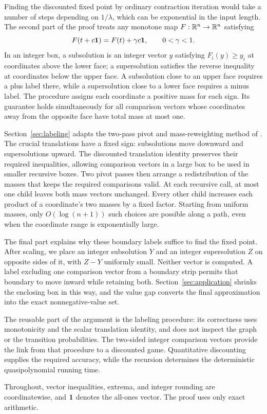 Finding the discounted fixed point by ordinary contraction iteration
would take a number of steps depending on $1/\lambda$, which can be
exponential in the input length. The second part of the proof treats
any monotone map $F:\mathbb R^n\to\mathbb R^n$ satisfying
\[
             F(t+c\mathbf 1)=F(t)+\gamma c\mathbf 1,
             \qquad 0<\gamma<1.
\]
In an integer box, a subsolution is an integer vector $y$ satisfying
$F_i(y)\ge y_i$ at coordinates above the lower face; a supersolution
satisfies the reverse inequality at coordinates below the upper face.
A subsolution close to an upper face requires a plus label there,
while a supersolution close to a lower face requires a minus label.
The procedure assigns each coordinate a positive mass for each sign.
Its guarantee holds simultaneously for all comparison vectors whose
coordinates away from the opposite face have total mass at most one.

Section~\ref{sec:labeling} adapts the two-pass pivot and mass-reweighting
method of \citet[Sections~4--5]{OpenAI2026Deterministic}.
The crucial translations have a fixed sign: subsolutions move downward
and supersolutions upward. The discounted translation identity preserves
their required inequalities, allowing comparison vectors in a large box
to be used in smaller recursive boxes. Two pivot passes then arrange a
redistribution of the masses that keeps the required comparisons valid.
At each recursive call, at most one child leaves both mass vectors
unchanged. Every other child increases each product of a coordinate's
two masses by a fixed factor. Starting from uniform masses, only
$O(\log(n+1))$ such choices are possible along a path, even when the
coordinate range is exponentially large.

The final part explains why these boundary labels suffice to find the
fixed point. After scaling, we place an integer subsolution $Y$ and an
integer supersolution $Z$ on opposite sides of it, with $Z-Y$ uniformly
small. Neither vector is computed. A label excluding one comparison
vector from a boundary strip permits that boundary to move inward while
retaining both. Section~\ref{sec:application} shrinks the enclosing box
in this way, and the value gap converts the final approximation into
the exact nonnegative-value set.

The reusable part of the argument is the labeling procedure: its
correctness uses monotonicity and the scalar translation identity,
and does not inspect the graph or the transition probabilities. The
two-sided integer comparison vectors provide the link from that
procedure to a discounted game. Quantitative discounting supplies the
required accuracy, while the recursion determines the deterministic
quasipolynomial running time.

Throughout, vector inequalities, extrema, and integer rounding are
coordinatewise, and $\mathbf 1$ denotes the all-ones vector. The proof uses
only exact arithmetic.
